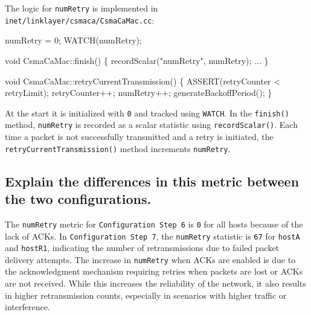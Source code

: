 \documentclass[
  letterpaper,
  DIV=11,
  numbers=noendperiod]{scrartcl}
\newenvironment{Shaded}{\begin{snugshade}}{\end{snugshade}}
\newcommand{\DataTypeTok}[1]{\textcolor[rgb]{0.68,0.00,0.00}{#1}}
\newcommand{\DecValTok}[1]{\textcolor[rgb]{0.68,0.00,0.00}{#1}}
\newcommand{\NormalTok}[1]{\textcolor[rgb]{0.00,0.23,0.31}{#1}}
\newcommand{\OperatorTok}[1]{\textcolor[rgb]{0.37,0.37,0.37}{#1}}
\newcommand{\StringTok}[1]{\textcolor[rgb]{0.13,0.47,0.30}{#1}}
\begin{document}
The logic for \texttt{numRetry} is implemented in
\texttt{inet/linklayer/csmaca/CsmaCaMac.cc}:

\begin{Shaded}
\begin{Highlighting}[]
\NormalTok{numRetry }\OperatorTok{=} \DecValTok{0}\OperatorTok{;}
\NormalTok{WATCH}\OperatorTok{(}\NormalTok{numRetry}\OperatorTok{);}

\DataTypeTok{void}\NormalTok{ CsmaCaMac}\OperatorTok{::}\NormalTok{finish}\OperatorTok{()}
\OperatorTok{\{}
\NormalTok{    recordScalar}\OperatorTok{(}\StringTok{"numRetry"}\OperatorTok{,}\NormalTok{ numRetry}\OperatorTok{);}
    \OperatorTok{...}
\OperatorTok{\}}

\DataTypeTok{void}\NormalTok{ CsmaCaMac}\OperatorTok{::}\NormalTok{retryCurrentTransmission}\OperatorTok{()}
\OperatorTok{\{}
\NormalTok{    ASSERT}\OperatorTok{(}\NormalTok{retryCounter }\OperatorTok{\textless{}}\NormalTok{ retryLimit}\OperatorTok{);}
\NormalTok{    retryCounter}\OperatorTok{++;}
\NormalTok{    numRetry}\OperatorTok{++;}
\NormalTok{    generateBackoffPeriod}\OperatorTok{();}
\OperatorTok{\}}
\end{Highlighting}
\end{Shaded}

At the start it is initialized with \texttt{0} and tracked using
\texttt{WATCH}. In the \texttt{finish()} method, \texttt{numRetry} is
recorded as a scalar statistic using \texttt{recordScalar()}. Each time
a packet is not successfully transmitted and a retry is initiated, the
\texttt{retryCurrentTransmission()} method increments \texttt{numRetry}.

\subsection{Explain the differences in this metric between the two
configurations.}\label{explain-the-differences-in-this-metric-between-the-two-configurations.}

The \texttt{numRetry} metric for \texttt{Configuration\ Step\ 6} is
\texttt{0} for all hosts because of the lack of ACKs. In
\texttt{Configuration\ Step\ 7}, the \texttt{numRetry} statistic is
\texttt{67} for \texttt{hostA} and \texttt{hostR1}, indicating the
number of retransmissions due to failed packet delivery attempts. The
increase in \texttt{numRetry} when ACKs are enabled is due to the
acknowledgment mechanism requiring retries when packets are lost or ACKs
are not received. While this increases the reliability of the network,
it also results in higher retransmission counts, especially in scenarios
with higher traffic or interference.
\end{document}
